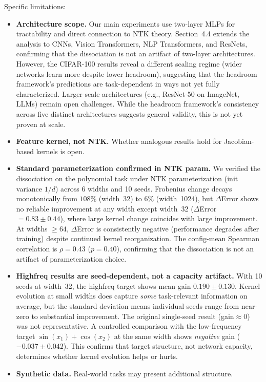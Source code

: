 \documentclass[twoside,11pt]{article}
\begin{document}
Specific limitations:
\begin{itemize}
    \item \textbf{Architecture scope.}  Our main experiments use two-layer MLPs for tractability and direct connection to NTK theory.  Section~4.4 extends the analysis to CNNs, Vision Transformers, NLP Transformers, and ResNets, confirming that the dissociation is not an artifact of two-layer architectures.  However, the CIFAR-100 results reveal a different scaling regime (wider networks learn more despite lower headroom), suggesting that the headroom framework's predictions are task-dependent in ways not yet fully characterized.  Larger-scale architectures (e.g., ResNet-50 on ImageNet, LLMs) remain open challenges.  While the headroom framework's consistency across five distinct architectures suggests general validity, this is not yet proven at scale.
    \item \textbf{Feature kernel, not NTK.}  Whether analogous results hold for Jacobian-based kernels is open.
    \item \textbf{Standard parameterization confirmed in NTK param.}  We verified the dissociation on the polynomial task under NTK parameterization (init variance $1/d$) across 6 widths and 10 seeds. Frobenius change decays monotonically from $108\%$ (width~32) to $6\%$ (width~1024), but $\Delta$Error shows no reliable improvement at any width except width~32 ($\Delta$Error $=0.83\pm0.44$), where large kernel change coincides with large improvement. At widths $\ge 64$, $\Delta$Error is consistently negative (performance degrades after training) despite continued kernel reorganization. The config-mean Spearman correlation is $\rho=0.43$ ($p=0.40$), confirming that the dissociation is not an artifact of parameterization choice.
    \item \textbf{Highfreq results are seed-dependent, not a capacity artifact.}  With 10 seeds at width~32, the highfreq target shows mean gain $0.190\pm0.130$. Kernel evolution at small widths does capture \emph{some} task-relevant information on average, but the standard deviation means individual seeds range from near-zero to substantial improvement.  The original single-seed result (gain$\approx0$) was not representative.  A controlled comparison with the low-frequency target $\sin(x_1)+\cos(x_2)$ at the same width shows \emph{negative} gain ($-0.037\pm0.042$). This confirms that target structure, not network capacity, determines whether kernel evolution helps or hurts.
    \item \textbf{Synthetic data.}  Real-world tasks may present additional structure.

\end{itemize}
\end{document}
